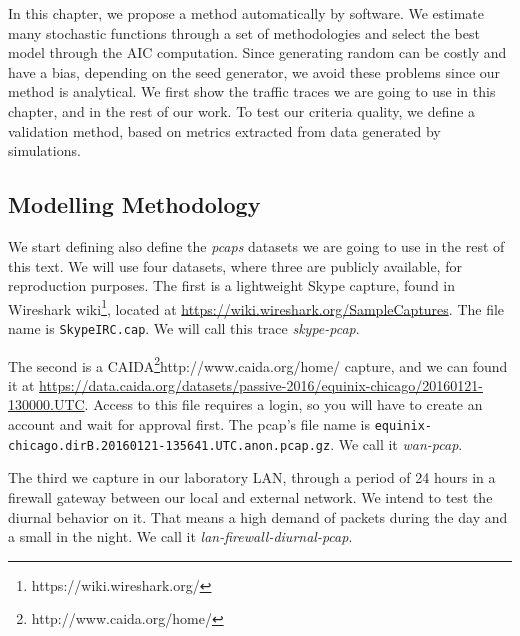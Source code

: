 In this chapter, we propose a method automatically by software. We estimate many stochastic functions through a set of methodologies and select the best model through the AIC computation\cite{bic-aic-comparision}. Since generating random can be costly and have a bias, depending on the seed generator, we avoid these problems since our method is analytical. We first show the traffic traces we are going to use in this chapter, and in the rest of our work. To test our criteria quality, we define a validation method, based on metrics extracted from data generated by simulations.


\subsection{Modelling Methodology}

We start defining also define the \textit{pcaps} datasets we are going to use in the rest of this text. We will use four datasets, where three are publicly available, for reproduction purposes. 
The first is a lightweight Skype capture, found in  Wireshark wiki\footnote{https://wiki.wireshark.org/}, located  at \href{https://wiki.wireshark.org/SampleCaptures}{https://wiki.wireshark.org/SampleCaptures}. The file name is \texttt{SkypeIRC.cap}. We will call this trace \textit{skype-pcap}.

The second is a CAIDA\footnote{http://www.caida.org/home/}{http://www.caida.org/home/} capture, and we can found it at  \href{https://data.caida.org/datasets/passive-2016/equinix-chicago/20160121-130000.UTC}{https://data.caida.org/datasets/passive-2016/equinix-chicago/20160121-130000.UTC}. Access to this file requires a login, so you will have to create an account and wait for approval first. The pcap's file name is \texttt{equinix-chicago.dirB.20160121-135641.UTC.anon.pcap.gz}. We call it \textit{wan-pcap}.

The third we capture in our laboratory LAN, through a period of 24 hours in a firewall gateway between our local and external network. We intend to test the diurnal behavior on it. That means a high demand of packets during the day and a small in the night. We call it \textit{lan-firewall-diurnal-pcap}.

